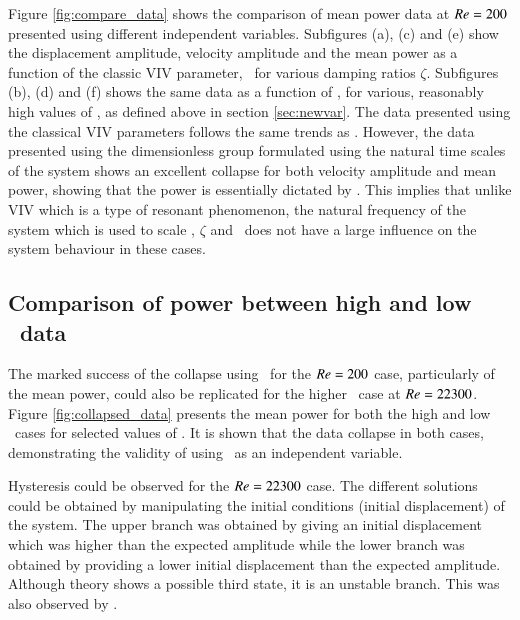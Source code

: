 Figure \ref{fig:compare_data} shows the comparison of mean power data at $Re=200$ presented using different independent variables. Subfigures (a), (c) and (e) show the displacement amplitude, velocity amplitude and the mean power as a function of the classic VIV parameter, \ustar \ for various damping ratios $\zeta$. Subfigures (b), (d) and (f) shows the same data as a function of \massdamp, for various, reasonably high values of \massstiff, as defined above in section \ref{sec:newvar}. The data presented using the classical VIV parameters follows the same trends as \cite{Barrero-Gil2010a}. However, the data presented using the dimensionless group formulated using the natural time scales of the system shows an excellent collapse for both velocity amplitude and mean power, showing that the power is essentially dictated by \massdamp. This implies that unlike VIV which is a type of resonant phenomenon, the natural frequency of the system which is used to scale \ustar, $\zeta$ and \massstiff\ does not have a large influence on the system behaviour in these cases.


    
\subsection{Comparison of power between high and low \reynoldsnumber\ data}   
\label{sec:low_vs_high_re}
The marked success of the collapse using \massdamp\ for the $Re = 200$ case, particularly of the mean power, could also be replicated for the higher \reynoldsnumber\ case at $Re = 22300$. Figure \ref{fig:collapsed_data} presents the mean power for both the high and low \reynoldsnumber\ cases for selected values of \massstiff. It is shown that the data collapse in both cases, demonstrating the validity of using \massdamp\ as an independent variable.


         
Hysteresis could be observed for the $Re = 22300$ case. The different solutions could be obtained by manipulating the initial conditions (initial displacement) of the system. The upper branch was obtained by giving an initial displacement which was higher than the expected amplitude while the lower branch was obtained by providing a lower initial displacement than the expected amplitude. Although theory shows a possible third state, it is an unstable branch.  This was also observed by \cite{Vio2007}. 


